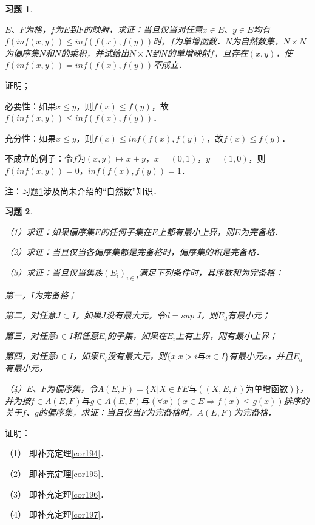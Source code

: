 \documentclass[12pt, a4paper, oneside]{book}
\newtheorem{exer}{习题}
\begin{document}
			\begin{exer}\label{exer86}
				\hfill\par
				$E$、$F$为格，$f$为$E$到$F$的映射，求证：当且仅当对任意$x\in E$、$y\in E$均有$f(inf(x, y))\leq inf(f(x), f(y))$时，$f$为单增函数．$N$为自然数集，$N\times N$为偏序集$N$和$N$的乘积，并试给出$N\times N$到$N$的单增映射$f$，且存在$(x, y)$，使$f(inf(x, y))=inf(f(x), f(y))$不成立．
			\end{exer}
			证明；
			\par
			必要性：如果$x\leq y$，则$f(x)\leq f(y)$，故$f(inf(x, y))\leq inf(f(x), f(y))$．
			\par
			充分性：如果$x\leq y$，则$f(x)\leq inf(f(x), f(y))$，故$f(x)\leq f(y)$．
			\par
			不成立的例子：令$f$为$(x, y)\mapsto x+y$，$x=(0, 1)$，$y=(1, 0)$，则$f(inf(x, y))=0$，$inf(f(x), f(y))=1$．
			\par
			注：习题\ref{exer86}涉及尚未介绍的“自然数”知识．
			
			\begin{exer}\label{exer87}
				\hfill\par
				（1）求证：如果偏序集$E$的任何子集在$E$上都有最小上界，则$E$为完备格．
				\par
				（2）求证：当且仅当各偏序集都是完备格时，偏序集的积是完备格．
				\par
				（3）求证：当且仅当集族$(E_i)_{i\in I}$满足下列条件时，其序数和为完备格：
				\par
				第一，$I$为完备格；
				\par
				第二，对任意$J\subset I$，如果$J$没有最大元，令$d=sup\ J$，则$E_d$有最小元；
				\par
				第三，对任意$i\in I$和任意$E_i$的子集，如果在$E_i$上有上界，则有最小上界；
				\par
				第四，对任意$i\in I$，如果$E_i$没有最大元，则$\{x|x>i\text{与}x\in I\}$有最小元$a$，并且$E_a$有最小元，
				\par
				（4）$E$、$F$为偏序集，令$A(E, F)=\{X|X\in FE\text{与}((X, E, F)\text{为单增函数})\}$，并为按$f\in A(E, F)\text{与}g\in A(E, F)\text{与}(\forall x)(x\in E\Rightarrow f(x)\leq g(x))$排序的关于$f$、$g$的偏序集，求证：当且仅当$F$为完备格时，$A(E, F)$为完备格．
			\end{exer}
			证明：
			\par
			（1）	即补充定理\ref{cor194}．
			\par
			（2）	即补充定理\ref{cor195}．
			\par
			（3）	即补充定理\ref{cor196}．
			\par
			（4）	即补充定理\ref{cor197}．
			
\end{document}
